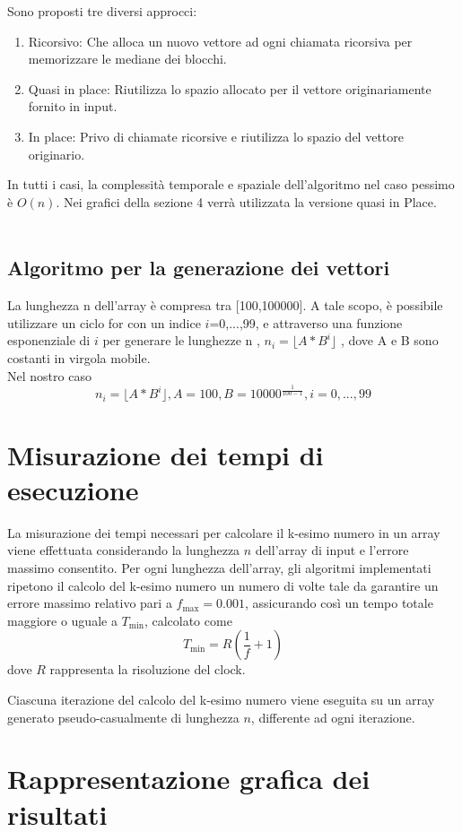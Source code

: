\documentclass[a4paper]{article}
\begin{document}
Sono proposti tre diversi approcci:
\begin{enumerate}
    \item Ricorsivo: Che alloca un nuovo vettore ad ogni chiamata ricorsiva per memorizzare le mediane dei blocchi.
    \item Quasi in place: Riutilizza lo spazio allocato per il vettore originariamente fornito in input.
    \item In place: Privo di chiamate ricorsive e riutilizza lo spazio del vettore originario.
\end{enumerate}
In tutti i casi, la complessità temporale e spaziale dell'algoritmo nel caso pessimo è \( O(n) \). Nei grafici della sezione 4 verrà utilizzata la versione quasi in Place.\\
\\
\subsection{Algoritmo per la generazione dei vettori}
La lunghezza n dell'array è compresa tra [100,100000].
A tale scopo, è possibile utilizzare un ciclo for con un indice $i$=0,...,99, e attraverso una funzione esponenziale di $i$ per generare le lunghezze n
, $n_i=\lfloor A*B^i\rfloor$ , dove A e B sono costanti in virgola mobile.\\
Nel nostro caso \[n_i=\lfloor A*B^i\rfloor, A=100, B=10000^{\frac{1}{100-1}},i=0,...,99\]
\section{Misurazione dei tempi di esecuzione}
La misurazione dei tempi necessari per calcolare il k-esimo numero in un array viene effettuata considerando la lunghezza \( n \) dell'array di input e l'errore massimo consentito. Per ogni lunghezza dell'array, gli algoritmi implementati ripetono il calcolo del k-esimo numero un numero di volte tale da garantire un errore massimo relativo pari a \( f_{\max} = 0.001 \), assicurando così un tempo totale maggiore o uguale a \( T_{\min} \), calcolato come \[ T_{\min} = R \left( \frac{1}{f} + 1 \right) \] dove \( R \) rappresenta la risoluzione del clock.

Ciascuna iterazione del calcolo del k-esimo numero viene eseguita su un array generato pseudo-casualmente di lunghezza \( n \), differente ad ogni iterazione.
\newpage
\section{Rappresentazione grafica dei risultati}
\end{document}
